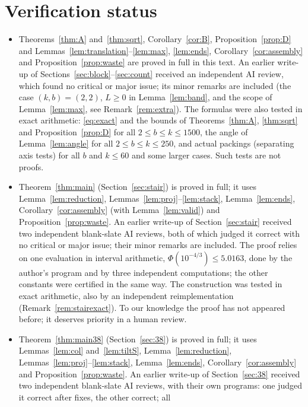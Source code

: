 \documentclass[11pt]{amsart}
\theoremstyle{definition}
\theoremstyle{remark}
\numberwithin{equation}{section}
\begin{document}
\section*{Verification status}
\begin{itemize}
\item Theorems~\ref{thm:A} and~\ref{thm:sqrt}, Corollary~\ref{cor:B}, Proposition~\ref{prop:D} and
Lemmas~\ref{lem:translation}--\ref{lem:max}, \ref{lem:ends}, Corollary~\ref{cor:assembly} and
Proposition~\ref{prop:waste} are proved in full in this text. An earlier write-up of Sections~\ref{sec:block}--\ref{sec:count}
received an independent AI review, which found no critical or major issue; its minor remarks are included (the case
$(k,b)=(2,2)$, $L\ge0$ in Lemma~\ref{lem:band}, and the scope of Lemma~\ref{lem:max}, see Remark~\ref{rem:extra}). The
formulas were also tested in exact arithmetic: \eqref{eq:exact} and the bounds of Theorems~\ref{thm:A}, \ref{thm:sqrt}
and Proposition~\ref{prop:D} for all $2\le b\le k\le1500$, the angle of Lemma~\ref{lem:angle} for all $2\le b\le k\le250$,
and actual packings (separating axis tests) for all $b$ and $k\le60$ and some larger cases. Such tests are not proofs.
\item Theorem~\ref{thm:main} (Section~\ref{sec:stair}) is proved in full; it uses Lemma~\ref{lem:reduction},
Lemmas~\ref{lem:proj}--\ref{lem:stack}, Lemma~\ref{lem:ends}, Corollary~\ref{cor:assembly} (with
Lemma~\ref{lem:valid}) and Proposition~\ref{prop:waste}. An earlier write-up of Section~\ref{sec:stair} received two
independent blank-slate AI reviews, both of which judged it correct with no critical or major issue; their minor
remarks are included. The proof relies on one evaluation in interval arithmetic, $\Phi(10^{-4/3})\le5.0163$, done by the
author's program and by three independent computations; the other constants were certified in the same way. The
construction was tested in exact arithmetic, also by an independent reimplementation (Remark~\ref{rem:stairexact}).
To our knowledge the proof has not appeared before; it deserves priority in a human review.
\item Theorem~\ref{thm:main38} (Section~\ref{sec:38}) is proved in full; it uses Lemmas~\ref{lem:col}
and~\ref{lem:tiltS}, Lemma~\ref{lem:reduction}, Lemmas~\ref{lem:proj}--\ref{lem:stack}, Lemma~\ref{lem:ends},
Corollary~\ref{cor:assembly} and Proposition~\ref{prop:waste}. An earlier write-up of Section~\ref{sec:38} received two
independent blank-slate AI reviews, with their own programs: one judged it correct after fixes, the other correct; all

\end{itemize}
\end{document}
